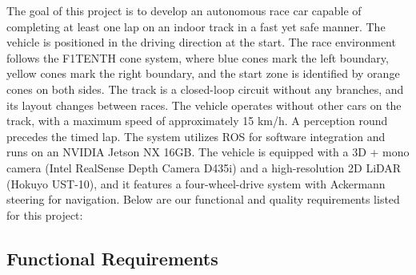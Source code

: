 The goal of this project is to develop an autonomous race car capable of completing at least one lap on an indoor track in a fast yet safe manner.
The vehicle is positioned in the driving direction at the start. The race environment follows the F1TENTH cone system, where blue cones mark the left boundary, yellow cones mark the right boundary, and the start zone is identified by orange cones on both sides. 
The track is a closed-loop circuit without any branches, and its layout changes between races. The vehicle operates without other cars on the track, with a maximum speed of approximately 15 km/h. 
A perception round precedes the timed lap. The system utilizes ROS for software integration and runs on an NVIDIA Jetson NX 16GB. The vehicle is equipped with a 3D + mono camera (Intel RealSense Depth Camera D435i) and a high-resolution 2D LiDAR (Hokuyo UST-10), and it features a four-wheel-drive system with Ackermann steering for navigation.
Below are our functional and quality requirements listed for this project:
\subsection{Functional Requirements}

